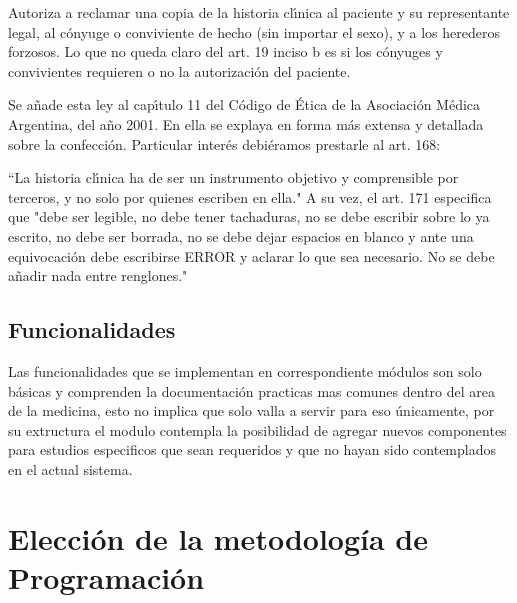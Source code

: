 Autoriza a reclamar una copia de la historia cl\'{\i}nica al paciente y su representante 
legal, al c\'onyuge o conviviente de hecho (sin importar el sexo), y a los herederos 
forzosos. Lo que no queda claro del art. 19 inciso b es si los c\'onyuges y 
convivientes requieren o no la autorizaci\'on del paciente.

Se a\~nade esta ley al cap\'{\i}tulo 11 del C\'odigo de Ética de la Asociaci\'on M\'edica 
Argentina, del a\~no 2001. En ella se explaya en forma m\'as extensa y detallada sobre
la confecci\'on. Particular inter\'es debi\'eramos prestarle al art. 168:

``La historia cl\'{\i}nica ha de ser un instrumento objetivo y comprensible por terceros,
y no solo por quienes escriben en ella." A su vez, el art. 171 especifica que 
"debe ser legible, no debe tener tachaduras, no se debe escribir sobre lo ya 
escrito, no debe ser borrada, no se debe dejar espacios en blanco y ante una
equivocaci\'on debe escribirse ERROR y aclarar lo que sea necesario. No se debe a\~nadir
nada entre renglones."


\subsection{Funcionalidades}

Las funcionalidades que se implementan en correspondiente módulos son solo
básicas y comprenden la documentación practicas mas comunes dentro del area de la 
medicina, esto no implica que solo valla a servir para eso únicamente, por su 
extructura el modulo contempla la posibilidad de agregar nuevos componentes para 
estudios especificos que sean requeridos y que no hayan sido contemplados en el 
actual sistema.







\section{Elecci\'on de la metodolog\'ia de Programaci\'on}

